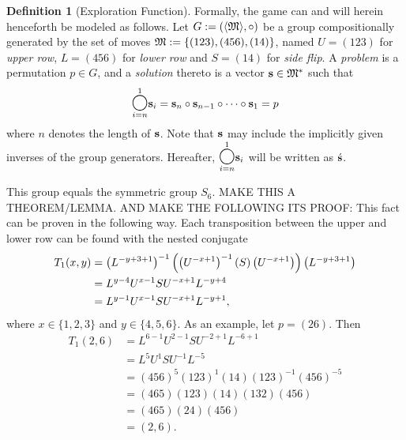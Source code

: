 \documentclass[a4paper,twoside,12pt,openany]{report}
\theoremstyle{plain}
\theoremstyle{definition}
\newtheorem{definition}{Definition}
\theoremstyle{remark}
\begin{document}
\begin{definition}[Exploration Function]
Formally, the game can and will herein henceforth be modeled as follows. Let \(G:=\left(\langle \mathfrak{M}\rangle,\circ\right) \) be a group compositionally generated by the set of moves \(\mathfrak{M} := \left\{ (123), (456), (14) \right\}\), named \(U=(123)\) for \textit{upper row}, \(L=(456)\) for \textit{lower row} and \(S=(14)\) for \textit{side flip}. A \textit{problem} is a permutation \(p\in G\), and a \textit{solution} thereto is a vector \(\mathbf{s}\in\mathfrak{M}^\ast\) such that \[\overset{1}{\underset{i=n}{\bbigcirc}} \solarr_i=\solarr_n\circ \solarr_{n-1}\circ \cdots \circ \solarr_1=p\] where \(n\) denotes the length of \(\mathbf{s}\). Note that \(\mathbf{s}\) may include the implicitly given inverses of the group generators. Hereafter, \(\overset{1}{\underset{i=n}{\bbigcirc}} \solarr_i\) will be written as \(\acute{\mathbf{s}}\).

This group equals the symmetric group \(S_6\).  \color{orange}MAKE THIS A THEOREM/LEMMA. AND MAKE THE FOLLOWING ITS PROOF:  \color{black}  This fact can be proven in the following way. Each transposition between the upper and lower row can be found with the nested conjugate
\begin{align*}
T_1(x,y)
	&= \left(L^{-y+3+1}\right)^{-1}\left(\left(U^{-x+1}\right)^{-1}\left(S\right)\left(U^{-x+1}\right)\right)\left(L^{-y+3+1}\right) \\
    &= L^{y-4}U^{x-1}SU^{-x+1}L^{-y+4} \\
    &= L^{y-1}U^{x-1}SU^{-x+1}L^{-y+1},
\end{align*}
where \(x\in\{1,2,3\}\) and \(y\in\{4,5,6\}\).
As an example, let \(p=(26)\). Then
\begin{align*}
T_1(2,6)
    &= L^{6-1}U^{2-1}SU^{-2+1}L^{-6+1} \\
    &= L^{5}U^{1}SU^{-1}L^{-5} \\
	&= (456)^{5}(123)^{1}(14)(123)^{-1}(456)^{-5} \\
	&= (465)(123)(14)(132)(456) \\
	&= (465)(24)(456) \\
	&= (2,6).
\end{align*}

\end{definition}
\end{document}
